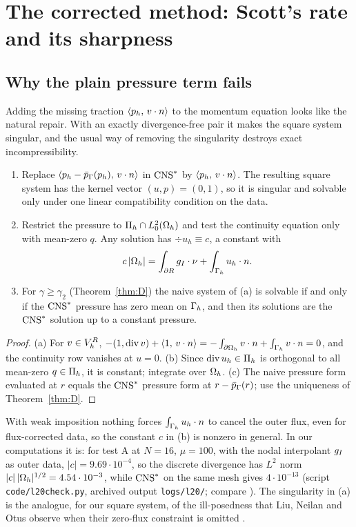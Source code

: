 \section{The corrected method: Scott's rate and its sharpness}\label{sec:corrected}

\subsection{Why the plain pressure term fails}
Adding the missing traction $\langle p_h,\, v\cdot n\rangle$ to the momentum equation looks like the natural repair. With an exactly divergence-free pair it makes the square system singular, and the usual way of removing the singularity destroys exact incompressibility.

\begin{proposition}\label{prop:singular}
\begin{enumerate}[label=(\alph*)]
\item Replace $\langle p_h-\bar p_{\Gamma}(p_h),\, v\cdot n\rangle$ in $\mathrm{CNS}^\ast$ by $\langle p_h,\, v\cdot n\rangle$. The resulting square system has the kernel vector $(u,p)=(0,1)$, so it is singular and solvable only under one linear compatibility condition on the data.
\item Restrict the pressure to $\Pi_h\cap L^2_0(\Omega_h)$ and test the continuity equation only with mean-zero $q$. Any solution has $\div u_h\equiv c$, a constant with
\[
c\,|\Omega_h|=\int_{\partial R}g_I\cdot\nu+\int_{\Gamma_h}u_h\cdot n .
\]
\item For $\gamma\ge\gamma_2$ (Theorem~\ref{thm:D}) the naive system of (a) is solvable if and only if the $\mathrm{CNS}^\ast$ pressure has zero mean on $\Gamma_h$, and then its solutions are the $\mathrm{CNS}^\ast$ solution up to a constant pressure.
\end{enumerate}
\end{proposition}

\begin{proof}
(a) For $v\in V_h^R$, $-(1,\operatorname{div} v)+\langle 1,\, v\cdot n\rangle=-\int_{\partial\Omega_h}v\cdot n+\int_{\Gamma_h}v\cdot n=0$, and the continuity row vanishes at $u=0$. (b) Since $\operatorname{div} u_h\in\Pi_h$ is orthogonal to all mean-zero $q\in\Pi_h$, it is constant; integrate over $\Omega_h$. (c) The naive pressure form evaluated at $r$ equals the $\mathrm{CNS}^\ast$ pressure form at $r-\bar p_{\Gamma}(r)$; use the uniqueness of Theorem~\ref{thm:D}.
\end{proof}

With weak imposition nothing forces $\int_{\Gamma_h}u_h\cdot n$ to cancel the outer flux, even for flux-corrected data, so the constant $c$ in (b) is nonzero in general. In our computations it is: for test A at $N=16$, $\mu=100$, with the nodal interpolant $g_I$ as outer data, $|c|=9.69\cdot10^{-4}$, so the discrete divergence has $L^2$ norm $|c|\,|\Omega_h|^{1/2}=4.54\cdot10^{-3}$, while $\mathrm{CNS}^\ast$ on the same mesh gives $4\cdot10^{-13}$ (script \texttt{code/l20check.py}, archived output \texttt{logs/l20/}; compare \cite[(5.9)]{FrachonNilssonZahedi2024}). The singularity in (a) is the analogue, for our square system, of the ill-posedness that Liu, Neilan and Otus observe when their zero-flux constraint is omitted \cite[Remark~3.2]{LiuNeilanOtus2023}.


